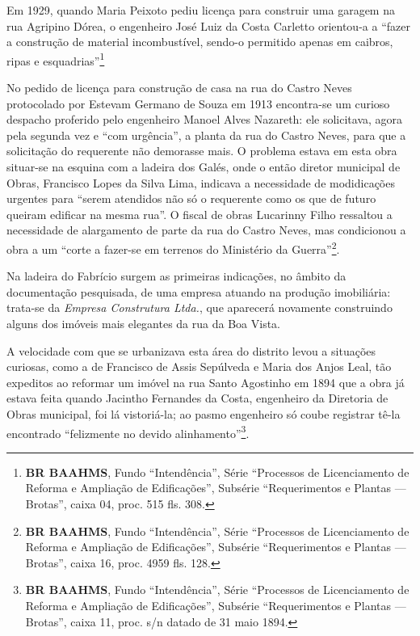 Em 1929, quando Maria Peixoto pediu licença para construir uma garagem na rua Agripino Dórea, o engenheiro José Luiz da Costa Carletto orientou-a a ``fazer a construção de material incombustível, sendo-o permitido apenas em caibros, ripas e esquadrias''\footnote{\textbf{BR BAAHMS}, Fundo ``Intendência'', Série ``Processos de Licenciamento de Reforma e Ampliação de Edificações'', Subsérie ``Requerimentos e Plantas --- Brotas'', caixa 04, proc. 515 fls. 308.}

No pedido de licença para construção de casa na rua do Castro Neves protocolado por Estevam Germano de Souza em 1913 encontra-se um curioso despacho proferido pelo engenheiro Manoel Alves Nazareth: ele solicitava, agora pela segunda vez e ``com urgência'', a planta da rua do Castro Neves, para que a solicitação do requerente não demorasse mais. O problema estava em esta obra situar-se na esquina com a ladeira dos Galés, onde o então diretor municipal de Obras, Francisco Lopes da Silva Lima, indicava a necessidade de modidicações urgentes para ``serem atendidos não só o requerente como os que de futuro queiram edificar na mesma rua''. O fiscal de obras Lucarinny Filho ressaltou a necessidade de alargamento de parte da rua do Castro Neves, mas condicionou a obra a um ``corte a fazer-se em terrenos do Ministério da Guerra''\footnote{\textbf{BR BAAHMS}, Fundo ``Intendência'', Série ``Processos de Licenciamento de Reforma e Ampliação de Edificações'', Subsérie ``Requerimentos e Plantas --- Brotas'', caixa 16, proc. 4959 fls. 128.}.


Na ladeira do Fabrício surgem as primeiras indicações, no âmbito da documentação pesquisada, de uma empresa atuando na produção imobiliária: trata-se da \textit{Empresa Construtura Ltda.}, que aparecerá novamente construindo alguns dos imóveis mais elegantes da rua da Boa Vista.

A velocidade com que se urbanizava esta área do distrito levou a situações curiosas, como a de Francisco de Assis Sepúlveda e Maria dos Anjos Leal, tão expeditos ao reformar um imóvel na rua Santo Agostinho em 1894 que a obra já estava feita quando Jacintho Fernandes da Costa, engenheiro da Diretoria de Obras municipal, foi lá vistoriá-la; ao pasmo engenheiro só coube registrar tê-la encontrado ``felizmente no devido alinhamento''\footnote{\textbf{BR BAAHMS}, Fundo ``Intendência'', Série ``Processos de Licenciamento de Reforma e Ampliação de Edificações'', Subsérie ``Requerimentos e Plantas --- Brotas'', caixa 11, proc. s/n datado de 31 maio 1894.}.

